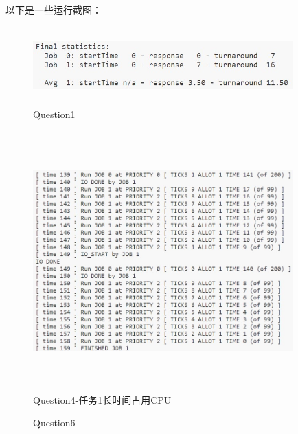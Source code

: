 \documentclass[12pt]{article}
\begin{document}
\begin{large}
	\noindent 以下是一些运行截图：
\end{large}
\begin{figure}[h]
	\centering
	\includegraphics[height=3cm,width=10cm]{p1.jpg}
	\caption{Question1}
\end{figure}
\newpage
\begin{figure}[h]
	\centering
	\includegraphics[height=10cm,width=10cm]{p4.jpg}
	\caption{Question4-任务1长时间占用CPU}
\end{figure}
\begin{figure}[!h]
    \centering
    \hfill
	\caption{Question6}
\end{figure}
\end{document}
